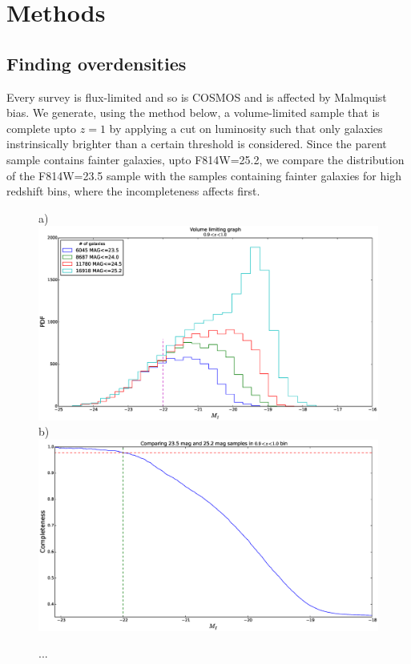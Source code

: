 \documentclass[twocolumn,useAMS,usenatbib]{mn2e}
\begin{document}
\section{Methods}
\label{S:methods}
\subsection{Finding overdensities}
\label{sub:overdensities}
Every survey is flux-limited and so is COSMOS and is affected by Malmquist bias.
We generate, using the method below, a volume-limited sample that is complete upto $z=1$ by applying a cut on luminosity such that only galaxies instrinsically brighter than a certain threshold is considered.
Since the parent sample contains fainter galaxies, upto F814W=25.2, we compare the distribution of the F814W=23.5 sample with the samples containing fainter galaxies for high redshift bins, where the incompleteness affects first.
\begin{figure}
 \centering
 a) \includegraphics[width=\columnwidth]{volume_limiting_pdf}
 b) \includegraphics[width=\columnwidth]{volume_limiting_cdf}
 \label{fig:volume_limiting_dist}
 \caption{ ... }
\end{figure}
\end{document}

